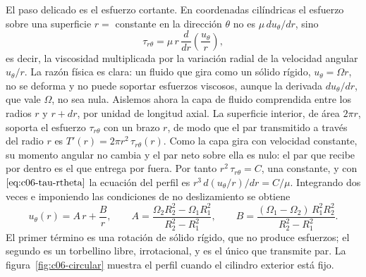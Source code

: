 \documentclass[10pt,openany]{book}
\begin{document}
El paso delicado es el esfuerzo cortante. En coordenadas cilíndricas el esfuerzo sobre una superficie \(r = \) constante en la dirección \(\theta\) no es \(\mu\,du_\theta/dr\), sino
\begin{equation}
\tau_{r\theta} = \mu\, r\,\frac{d}{dr}\!\left(\frac{u_\theta}{r}\right), \label{eq:c06-tau-rtheta}
\end{equation}
es decir, la viscosidad multiplicada por la variación radial de la velocidad angular \(u_\theta/r\). La razón física es clara: un fluido que gira como un sólido rígido, \(u_\theta = \Omega r\), no se deforma y no puede soportar esfuerzos viscosos, aunque la derivada \(du_\theta/dr\), que vale \(\Omega\), no sea nula. Aislemos ahora la capa de fluido comprendida entre los radios \(r\) y \(r + dr\), por unidad de longitud axial. La superficie interior, de área \(2\pi r\), soporta el esfuerzo \(\tau_{r\theta}\) con un brazo \(r\), de modo que el par transmitido a través del radio \(r\) es \(T'(r) = 2\pi r^{2}\,\tau_{r\theta}(r)\). Como la capa gira con velocidad constante, su momento angular no cambia y el par neto sobre ella es nulo: el par que recibe por dentro es el que entrega por fuera. Por tanto \(r^{2}\,\tau_{r\theta} = C\), una constante, y con \(\eqref{eq:c06-tau-rtheta}\) la ecuación del perfil es \(r^{3}\,d(u_\theta/r)/dr = C/\mu\). Integrando dos veces e imponiendo las condiciones de no deslizamiento se obtiene
\begin{equation}
u_\theta(r) = A\,r + \frac{B}{r},\qquad A = \frac{\Omega_2 R_2^{2} - \Omega_1 R_1^{2}}{R_2^{2} - R_1^{2}},\qquad B = \frac{(\Omega_1 - \Omega_2)\,R_1^{2} R_2^{2}}{R_2^{2} - R_1^{2}}. \label{eq:c06-couette-circular}
\end{equation}
El primer término es una rotación de sólido rígido, que no produce esfuerzos; el segundo es un torbellino libre, irrotacional, y es el único que transmite par. La figura~\ref{fig:c06-circular} muestra el perfil cuando el cilindro exterior está fijo.
\end{document}

